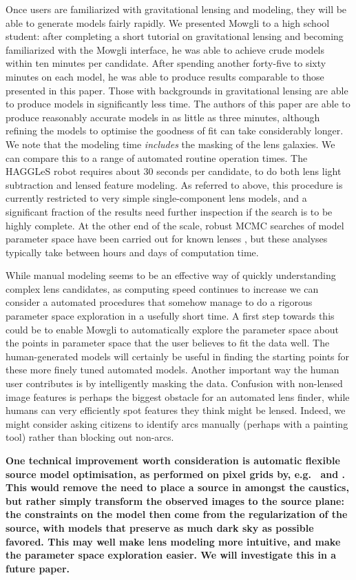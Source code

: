 \documentclass[iop]{emulateapj}
\def\eg{{\it e.g.}\,}
\def\theapplet{{\sc Mowgli}\xspace}
\def\NEW#1{{\bf{#1}}}
\begin{document}
Once users are familiarized with gravitational lensing and modeling, they will
be able to generate models fairly rapidly. We presented \theapplet to a high
school student: after completing a short tutorial on gravitational lensing and
becoming familiarized with the \theapplet interface, he was able to achieve
crude models within ten minutes per candidate. After spending another forty-five
to sixty minutes on each model, he was able to produce results comparable to
those presented in this paper. Those with backgrounds in gravitational lensing
are able to produce models in significantly less time. The authors of this paper
are able to produce reasonably accurate models  in as little as three minutes,
although refining the models  to optimise the goodness of fit can take
considerably longer. We note that the modeling time {\it includes} the masking
of the lens galaxies. We can compare this to a range of automated routine
operation times. The HAGGLeS robot requires about 30 seconds per candidate, to
do both lens light subtraction and lensed feature modeling. As referred to
above, this procedure is currently restricted to very simple single-component
lens models, and a significant fraction of the results need  further inspection
if the search is  to be highly complete. At the other end of the scale, robust
MCMC searches of model parameter space have been carried out for known lenses
\citep[\eg]{Mar++07,Jul++07,V+K09}, but these  analyses typically take between 
hours and days of computation time.

While manual modeling seems to be an effective way of quickly understanding 
complex lens candidates, as computing speed continues to increase we can
consider a automated procedures that somehow manage to do a rigorous parameter
space exploration in a usefully short time. A first step towards this could be
to enable \theapplet to automatically explore the parameter space about the
points in parameter space that the user believes to fit the data well.  The
human-generated models will certainly be useful in finding the starting points
for these more finely tuned automated models. Another important way  the human
user contributes is by intelligently masking the data. Confusion with non-lensed
image features is perhaps the biggest obstacle for an automated lens finder,
while humans can very efficiently spot features they think might be lensed.
Indeed, we might consider asking citizens to identify arcs manually (perhaps
with a painting tool) rather than blocking out non-arcs. 

\NEW{One technical improvement worth consideration is automatic
flexible source model optimisation, as performed on pixel grids by, e.g.\
\citet{W+D03} and \citet{Koo05}. This would remove the need to place a source
in amongst the caustics, but rather simply transform the observed images to
the source plane: the constraints on the model then come from the
regularization of the source, with models that preserve as much dark sky as
possible favored. This may well make lens modeling more intuitive, and 
make the parameter space exploration easier. We will investigate this in
a future paper.}
\end{document}
